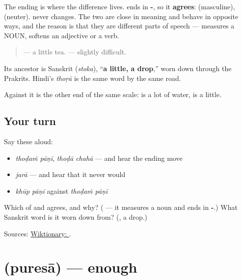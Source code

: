 The ending is where the difference lives. \textbf{} ends in \textbf{-}, so it \textbf{agrees}: \textbf{ } (masculine), \textbf{ } (neuter). \textbf{} never changes. The two are close in meaning and behave in opposite ways, and the reason is that they are different parts of speech — \textbf{} measures a NOUN, \textbf{} softens an adjective or a verb.

\begin{quote}
\textbf{ } — a little tea. \textbf{ } — slightly difficult.
\end{quote}

Its ancestor is Sanskrit \textbf{} (\emph{stoka}), \textquotedblleft{}\textbf{a little, a drop},\textquotedblright{} worn down through the Prakrits. Hindi's \emph{thoṛā} is the same word by the same road.

Against \textbf{} it is the other end of the same scale: \textbf{ } is a lot of water, \textbf{ } is a little.

\subsection*{Your turn}
Say these aloud:

\begin{itemize}
\raggedright
  \item \emph{thoḍaṁ pāṇī}, \emph{thoḍā chahā} — and hear the ending move
  \item \emph{jarā} — and hear that it never would
  \item \emph{khūp pāṇī} against \emph{thoḍaṁ pāṇī}
\end{itemize}

\begin{tcolorbox}[breakable,colback=teal!4,colframe=teal!35!black,title={Before you move on}]
Which of \textbf{} and \textbf{} agrees, and why? (\textbf{} — it measures a noun and ends in \textbf{-}.) What Sanskrit word is it worn down from? (\textbf{}, a drop.)

Sources: \href{https://en.wiktionary.org/wiki/\%E0\%A4\%A5\%E0\%A5\%8B\%E0\%A4\%A1\%E0\%A4\%BE}{Wiktionary: }.
\end{tcolorbox}
\section[\texorpdfstring{\mr{पुरेसा} (puresā)}{पुरेसा (puresā)}]{ (puresā) — enough}

